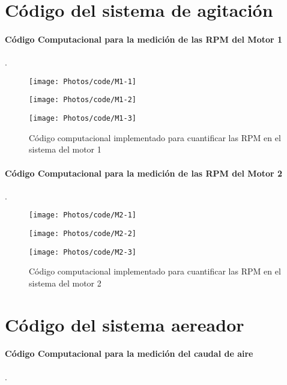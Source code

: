 \documentclass[11pt,letter
								]
								{article}
\begin{document}
\newpage
	\section{Código del sistema de agitación}
\paragraph{Código Computacional para la medición de las RPM del Motor 1 }.
\begin{figure}[H]
\centering
\texttt{[image: Photos/code/M1-1]}
\end{figure}

\begin{figure}[H]
\centering
\texttt{[image: Photos/code/M1-2]}
\end{figure}

\begin{figure}[H]
\centering
\texttt{[image: Photos/code/M1-3]}
\caption{Código computacional implementado para cuantificar las RPM en el sistema del motor 1 }
\end{figure}


\newpage

\paragraph{Código Computacional para la medición de las RPM del Motor 2 }.
\begin{figure}[H]
\centering
\texttt{[image: Photos/code/M2-1]}
\end{figure}
\begin{figure}[H]
\centering
\texttt{[image: Photos/code/M2-2]}
\end{figure}



\begin{figure}[H]
\centering
\texttt{[image: Photos/code/M2-3]}
\caption{Código computacional implementado para cuantificar las RPM en el sistema del motor 2  }
\end{figure}

\newpage
	\section{Código del sistema aereador }
	\paragraph{Código Computacional para la medición del caudal de aire}.
\end{document}
